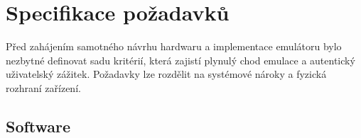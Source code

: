 
%

\chapter{Specifikace požadavků}

Před zahájením samotného návrhu hardwaru a implementace emulátoru bylo nezbytné definovat sadu
kritérií, která zajistí plynulý chod emulace a autentický uživatelský zážitek. Požadavky lze
rozdělit na systémové nároky a fyzická rozhraní zařízení.

\section{Software}

